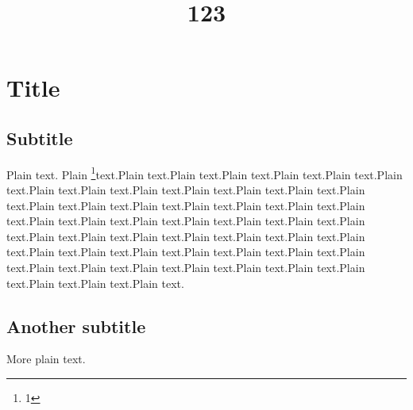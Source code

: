 \documentclass[a4paper,11pt,oneside,nexus]{tubsartcl}
\begin{document}
\title{123}
\section{Title}
\maketitle
\subsection{Subtitle}

Plain text. Plain \footnote{1}text.Plain text.Plain text.Plain text.Plain
text.Plain text.Plain text.Plain text.Plain text.Plain text.Plain text.Plain
text.Plain text.Plain text.Plain text.Plain text.Plain text.Plain text.Plain
text.Plain text.Plain text.Plain text.Plain text.Plain text.Plain text.Plain
text.Plain text.Plain text.Plain text.Plain text.Plain text.Plain text.Plain
text.Plain text.Plain text.Plain text.Plain text.Plain text.Plain text.Plain
text.Plain text.Plain text.Plain text.Plain text.Plain text.Plain text.Plain
text.Plain text.Plain text.Plain text.Plain text.Plain text.

\subsection{Another subtitle}

More plain text.
\end{document}
